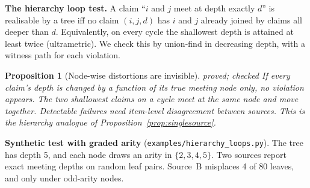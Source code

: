 \documentclass[11pt]{article}
\newtheorem{proposition}[theorem]{Proposition}
\theoremstyle{definition}
\theoremstyle{remark}
\newcommand{\st}[1]{\textsf{\small\color{gray}#1}}
\begin{document}
\textbf{The hierarchy loop test.} A claim ``$i$ and $j$ meet at depth exactly $d$'' is realisable by a tree iff no claim $(i,j,d)$ has $i$ and $j$ already joined by claims all deeper than $d$. Equivalently, on every cycle the shallowest depth is attained at least twice (ultrametric). We check this by union-find in decreasing depth, with a witness path for each violation.
\begin{proposition}[Node-wise distortions are invisible]\label{prop:nodewise}\st{proved; checked}
If every claim's depth is changed by a function of its true meeting node only, no violation appears. The two shallowest claims on a cycle meet at the same node and move together. Detectable failures need item-level disagreement between sources. This is the hierarchy analogue of Proposition~\ref{prop:singlesource}.
\end{proposition}
\textbf{Synthetic test with graded arity} (\texttt{examples/hierarchy\_loops.py}). The tree has depth 5, and each node draws an arity in $\{2,3,4,5\}$. Two sources report exact meeting depths on random leaf pairs. Source~B misplaces 4 of 80 leaves, and only under odd-arity nodes.
\end{document}
